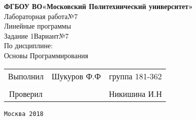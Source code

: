 \documentclass[a4paper]{article}
\begin{document}
\begin{center}
\hfill \break
\large{\textbf{ФГБОУ ВО«Московский Политехнический университет»}}\\
\hfill \break
\hfill \break
\hfill \break
\hfill \break
\hfill \break
\hfill \break
\hfill \break
\large{Лабораторная работа№7}\\
\footnotesize{Линейные программы\\
Задание 1\hspace{3cm}Вариант№7\break\\
По дисциплине:\\
Основы Программирования
}
\end{center}
\hfill \break
\hfill \break
\hfill \break
\hfill \break
\hfill \break
\hfill \break
\hfill \break
\hfill \break
\hfill \break
\hfill \break
\normalsize{ 
\begin{tabular}{ccc}
\hspace{4cm}Выполнил & Шукуров Ф.Ф  & группа 181-362\\
\\
\hspace{4cm}Проверил & \underline{\hspace{3cm}}& Никишина И.Н
\end{tabular}
}
\hfill \break
\hfill \break
\hfill \break
\hfill \break
\hfill \break
\hfill \break
\hfill \break
\hfill \break
\hfill \break
\hfill \break
\hfill \break
\hfill \break
\begin{center}\texttt{Москва 2018}\end{center}
\thispagestyle{empty}
\end{document}
